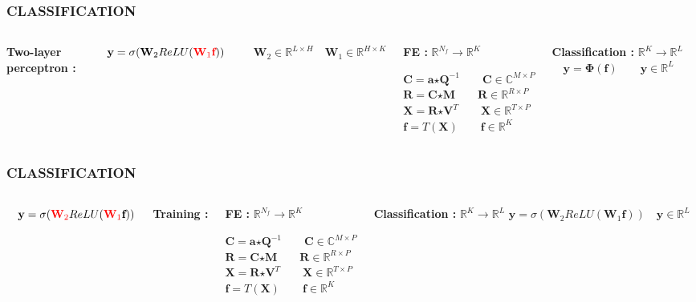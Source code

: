 \documentclass{beamer}
\begin{document}
\begin{frame}
\frametitle{CLASSIFICATION}
\begin{columns}[c]
\textbf{Two-layer perceptron :}
\bigskip

$\quad \textbf{y} = \sigma(\textbf{W}_{2}ReLU({\color{red}\textbf{W}_{1}\textbf{f}}))$
\bigskip

$\quad \textbf{W}_{2} \in \mathbb{R}^{L \times H} \quad \textbf{W}_{1} \in \mathbb{R}^{H \times K}$

\begin{block}{\textbf{FE :} $\mathbb{R}^{N_{f}} \rightarrow \mathbb{R}^{K}$}

$\textbf{C} = \textbf{a} \bm{\star} \textbf{Q}^{-1} \qquad \textbf{C} \in \mathbb{C}^{M \times P}$\\
$\textbf{R} = \textbf{C} \bm{\star} \textbf{M} \qquad \textbf{R} \in \mathbb{R}^{R \times P}$\\
$\textbf{X} = \textbf{R} \bm{\star} \textbf{V}^{T} \qquad \textbf{X} \in \mathbb{R}^{T \times P}$\\
$\textbf{f} = T(\textbf{X}) \qquad \textbf{f} \in \mathbb{R}^{K}$\\
\end{block}
\begin{block}{\textbf{Classification :} $\mathbb{R}^{K} \rightarrow \mathbb{R}^{L}$}
$\quad \textbf{y} = \bm{\Phi}(\textbf{f}) \qquad \textbf{y} \in \mathbb{R}^{L}$
\end{block}
\end{columns}
\end{frame}


\begin{frame}
\frametitle{CLASSIFICATION}
\begin{columns}[c]
$\quad \textbf{y} = \sigma({\color{red}\textbf{W}_{2}}ReLU({\color{red}\textbf{W}_{1}}\textbf{f}))$
\bigskip

\noindent \textbf{Training :}

\begin{block}{\textbf{FE :} $\mathbb{R}^{N_{f}} \rightarrow \mathbb{R}^{K}$}

$\textbf{C} = \textbf{a} \bm{\star} \textbf{Q}^{-1} \qquad \textbf{C} \in \mathbb{C}^{M \times P}$\\
$\textbf{R} = \textbf{C} \bm{\star} \textbf{M} \qquad \textbf{R} \in \mathbb{R}^{R \times P}$\\
$\textbf{X} = \textbf{R} \bm{\star} \textbf{V}^{T} \qquad \textbf{X} \in \mathbb{R}^{T \times P}$\\
$\textbf{f} = T(\textbf{X}) \qquad \textbf{f} \in \mathbb{R}^{K}$\\
\end{block}
\begin{block}{\textbf{Classification :} $\mathbb{R}^{K} \rightarrow \mathbb{R}^{L}$}
$\textbf{y} = \sigma(\textbf{W}_{2}ReLU(\textbf{W}_{1}\textbf{f})) \quad \textbf{y} \in \mathbb{R}^{L}$
\end{block}
\end{columns}
\end{frame}
\end{document}

